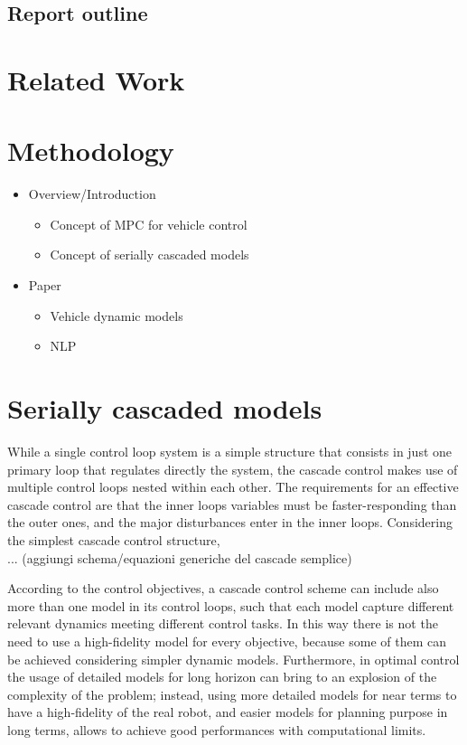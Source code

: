 \documentclass[a4paper, twocolumn, 11pt, twoside]{article}
\begin{document}
\subsection*{Report outline}

\section*{Related Work}

\section*{Methodology}

\begin{itemize}
    \item Overview/Introduction
    \begin{itemize}
        \item Concept of MPC for vehicle control
        \item Concept of serially cascaded models 
    \end{itemize}

    \item Paper
    \begin{itemize}
        \item Vehicle dynamic models
        \item NLP
    \end{itemize}    
\end{itemize}

\section*{Serially cascaded models}
While a single control loop system is a simple structure that consists in
just one primary loop that regulates directly the system, the cascade control
makes use of multiple control loops nested within each other. The requirements
for an effective cascade control are that the inner loops variables must be 
faster-responding than the outer ones, and the major disturbances enter in the 
inner loops. Considering the simplest cascade control structure,\\
... (aggiungi schema/equazioni generiche del cascade semplice)

According to the control objectives, a cascade control scheme can include also 
more than one model in its control loops, such that each model capture different
relevant dynamics meeting different control tasks. In this way there is not the 
need to use a high-fidelity model for every objective, because some of them can 
be achieved considering simpler dynamic models. Furthermore, in optimal control
the usage of detailed models for long horizon can bring to an explosion of the 
complexity of the problem; instead, using more detailed models for near terms 
to have a high-fidelity of the real robot, and easier models for planning purpose
in long terms, allows to achieve good performances with computational limits.
\end{document}
